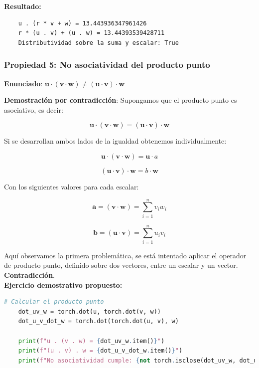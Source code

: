 \documentclass[12 pt]{article}
\begin{document}
\textbf{Resultado:}
\begin{lstlisting}
    u . (r * v + w) = 13.443936347961426
    r * (u . v) + (u . w) = 13.44393539428711
    Distributividad sobre la suma y escalar: True
\end{lstlisting}


\subsubsection*{Propiedad 5: No asociatividad del producto punto}

\begin{center}
\textbf{Enunciado}: \(\mathbf{u} \cdot (\mathbf{v} \cdot \mathbf{w}) \neq (\mathbf{u} \cdot \mathbf{v}) \cdot \mathbf{w}\)\\
\end{center}

\textbf{Demostración por contradicción}: Supongamos que el producto punto es asociativo, es decir:

\[
\mathbf{u} \cdot (\mathbf{v} \cdot \mathbf{w}) = (\mathbf{u} \cdot \mathbf{v}) \cdot \mathbf{w}
\]

Si se desarrollan ambos lados de la igualdad obtenemos individualmente:

\[
\mathbf{u} \cdot (\mathbf{v} \cdot \mathbf{w}) = \mathbf{u} \cdot a
\]

\[
(\mathbf{u} \cdot \mathbf{v}) \cdot \mathbf{w} = b \cdot \mathbf{w}
\]

Con los siguientes valores para cada escalar:

\[
\mathbf{a} = (\mathbf{v} \cdot \mathbf{w}) = \sum_{i=1}^{n} v_i w_i
\]

\[
\mathbf{b} = (\mathbf{u} \cdot \mathbf{v}) = \sum_{i=1}^{n} u_i v_i
\]

Aquí observamos la primera problemática, se está intentado aplicar el operador de producto punto, definido sobre dos vectores, entre un escalar y un vector. \textbf{Contradicción}.\\

\textbf{Ejercicio demostrativo propuesto:}
\begin{lstlisting}[language=Python]
    # Calcular el producto punto
    dot_uv_w = torch.dot(u, torch.dot(v, w))
    dot_u_v_dot_w = torch.dot(torch.dot(u, v), w)
    
    print(f"u . (v . w) = {dot_uv_w.item()}")
    print(f"(u . v) . w = {dot_u_v_dot_w.item()}")
    print(f"No asociatividad cumple: {not torch.isclose(dot_uv_w, dot_u_v_dot_w)}")
\end{lstlisting}
\end{document}
